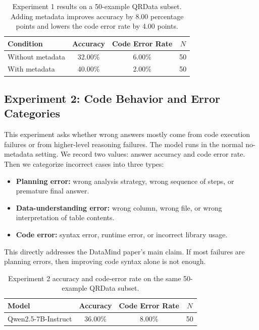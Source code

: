 \documentclass[11pt]{article}
\begin{document}
\begin{table}[t]
\centering
\small
\begin{tabular}{lccc}
\toprule
Condition & Accuracy & Code Error Rate & $N$ \\
\midrule
Without metadata & 32.00\% & 6.00\% & 50 \\
With metadata    & 40.00\% & 2.00\% & 50 \\
\bottomrule
\end{tabular}
\caption{Experiment 1 results on a 50-example QRData subset. Adding metadata improves accuracy by 8.00 percentage points and lowers the code error rate by 4.00 points.}
\label{tab:exp1}
\end{table}

\subsection{Experiment 2: Code Behavior and Error Categories}

This experiment asks whether wrong answers mostly come from code execution failures or from higher-level reasoning failures.
The model runs in the normal no-metadata setting.
We record two values: answer accuracy and code error rate.
Then we categorize incorrect cases into three types:
\begin{itemize}
    \item \textbf{Planning error:} wrong analysis strategy, wrong sequence of steps, or premature final answer.
    \item \textbf{Data-understanding error:} wrong column, wrong file, or wrong interpretation of table contents.
    \item \textbf{Code error:} syntax error, runtime error, or incorrect library usage.
\end{itemize}

This directly addresses the DataMind paper's main claim.
If most failures are planning errors, then improving code syntax alone is not enough.

\begin{table}[t]
\centering
\small
\begin{tabular}{lccc}
\toprule
Model & Accuracy & Code Error Rate & $N$ \\
\midrule
Qwen2.5-7B-Instruct & 36.00\% & 8.00\% & 50 \\
\bottomrule
\end{tabular}
\caption{Experiment 2 accuracy and code-error rate on the same 50-example QRData subset.}
\label{tab:exp2main}
\end{table}
\end{document}
